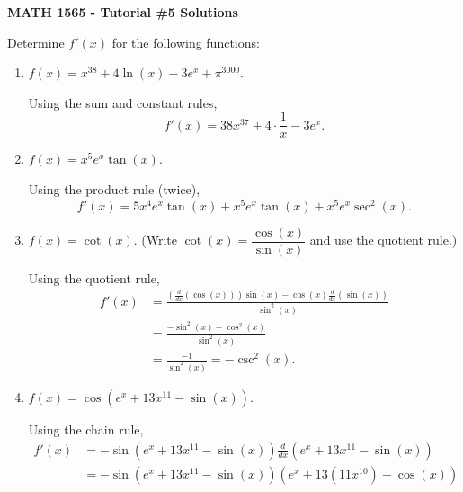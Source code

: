 \documentclass[12pt]{article}
\begin{document}
\author{Instructor: Sean Fitzpatrick}
\thispagestyle{empty}
\begin{center}
{\bf MATH 1565 - Tutorial \#5 Solutions}\\
\end{center}

Determine $f'(x)$ for the following functions: 
\begin{enumerate}
 \item   $f(x)= x^{38} + 4 \ln(x) -3e^{x} + \pi^{3000}$.

\bigskip

Using the sum and constant rules,
\[
f'(x) = 38x^{37}+4\cdot\frac{1}{x}-3e^x.
\]

\bigskip

 \item $f(x) =x^5e^{x}\tan(x)$.
 
\bigskip

Using the product rule (twice),
\[
f'(x) = 5x^4e^x\tan(x)+x^5e^x\tan(x)+x^5e^x\sec^2(x).
\]

\bigskip

 
 \item $f(x) = \cot(x)$. (Write $\cot(x)=\dfrac{\cos(x)}{\sin(x)}$ and use the quotient rule.)
 
\bigskip

Using the quotient rule,
\begin{align*}
f'(x) &= \frac{\left(\frac{d}{dx}(\cos(x))\right)\sin(x)-\cos(x)\frac{d}{dx}(\sin(x))}{\sin^2(x)}\\
& = \frac{-\sin^2(x)-\cos^2(x)}{\sin^2(x)}\\
& = \frac{-1}{\sin^2(x)} = -\csc^2(x).
\end{align*}
 
 \bigskip
 
 
 \item  $f(x) = \cos(e^{x}+ 13x^{11}-\sin(x))$. 
 
\bigskip

Using the chain rule,
\begin{align*}
f'(x) & = -\sin(e^{x}+ 13x^{11}-\sin(x))\frac{d}{dx}(e^{x}+ 13x^{11}-\sin(x))\\
& = -\sin(e^{x}+ 13x^{11}-\sin(x))(e^x+13(11x^{10})-\cos(x))
\end{align*}
\end{enumerate}
\end{document}
